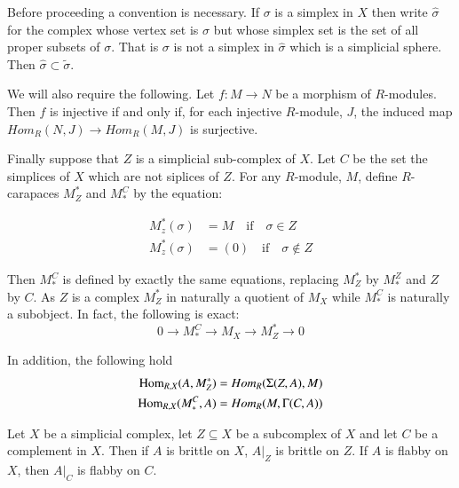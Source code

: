 Before proceeding a convention is necessary. If $\sigma$ is a simplex in $X$ then write $\hat{\sigma}$ for the complex whose vertex set is $\sigma$ but whose simplex set is the set of all proper subsets of $\sigma$. That is $\sigma$ is not a simplex in $\hat{\sigma}$ which is a simplicial sphere. Then $\hat{\sigma} \subset \tilde{\sigma}$.

We will also require the following. Let $f: M \rightarrow N$ be a morphism of $R$-modules. Then $f$ is injective if and only if, for each injective $R$-module, $J$, the induced map $Hom_{R}(N, J)\rightarrow  Hom_{R}(M, J)$ is surjective.

Finally suppose that $Z$ is a simplicial sub-complex of $X$. Let $C$ be the set the simplices of $X$ which are not siplices of $Z$. For any $R$-module, $M$, define $R$-carapaces $M_{Z}^{*}$ and $M_{*}^{C}$ by the equation:

\begin{equation}
\begin{aligned}\label{art6-eq-6.2}
M_{z}^{*}(\sigma) &= M \quad \text{if} \quad \sigma \in Z \\
M_{z}^{*}(\sigma) &= (0)\quad \text{if} \quad \sigma \notin Z
\end{aligned}
\end{equation}

Then $M_{*}^{C}$ is defined by exactly the same equations, replacing $M_{Z}^{*}$ by $M_{*}^{Z}$ and $Z$ by $C$. As $Z$ is a complex $M_{Z}^{*}$ in naturally a quotient of $M_{X}$ while $M_{*}^{C}$ is naturally a subobject. In fact, the following is exact:
$$
0 \rightarrow M_{*}^{C}\rightarrow M_{X}\rightarrow M_{Z}^{*} \rightarrow 0
$$

In addition, the following hold
\begin{equation}
\begin{aligned}\label{art6-eq-6.3}
\operatorname{Hom}_{R, X}(A, M_{Z}^{*}) &= Hom_{R}(\Sigma(Z, A), M)\\
\operatorname{Hom}_{R, X}(M_{*}^{C}, A) &= Hom_{R}(M, \Gamma (C, A))
\end{aligned}
\end{equation}


\begin{lem}\label{art6-lemma-6.4}
Let $X$ be a simplicial complex, let $Z \subseteq X$ be a subcomplex of $X$ and let $C$ be a complement in $X$. Then if $A$ is brittle on $X$, $A|_{Z}$ is brittle on $Z$. If $A$ is flabby on $X$, then $A|_{C}$ is flabby on $C$.
\end{lem}

